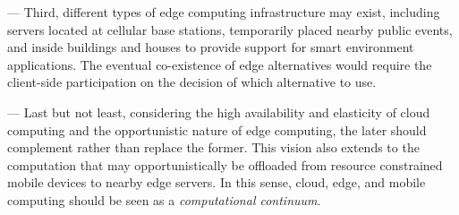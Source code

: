 
--- Third, different types of edge computing infrastructure may exist, including servers located at cellular base stations, temporarily placed nearby public events, and inside buildings and houses to provide support for smart environment applications. The eventual co-existence of edge alternatives would require the client-side participation on the decision of which alternative to use.

--- Last but not least, considering the high availability and elasticity of cloud computing and the opportunistic nature of edge computing, the later should complement rather than replace the former. This vision also extends to the computation that may opportunistically be offloaded from resource constrained mobile devices to nearby edge servers. In this sense, cloud, edge, and mobile computing should be seen as a \textit{computational continuum}.
 





